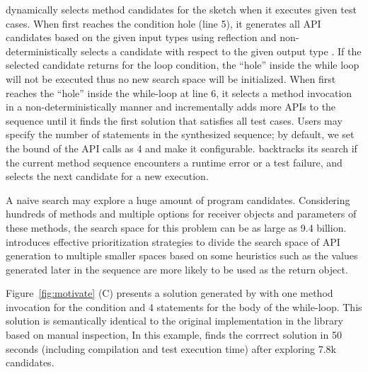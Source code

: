 \tool dynamically selects method candidates for the sketch when it executes given test cases.  When \tool first reaches the  condition hole (line 5), it generates all API candidates based on the given input types using reflection and non-deterministically selects a candidate  with respect to the given output type . If the selected candidate returns  for the  loop condition, the ``hole'' inside the while loop will not be executed thus no new search space will be initialized. When \tool first reaches the ``hole'' inside the while-loop at line 6, it  selects a method invocation in a non-deterministically manner and incrementally adds more APIs to the sequence until it finds the first solution that satisfies all test cases. Users may specify the number of statements in the synthesized sequence; by default, we set the bound of the API calls as 4 and make it configurable.  \tool backtracks its search if the current method sequence encounters a runtime error or a test failure, and selects the next candidate for a new execution.  

A naive search may explore a huge amount of program candidates. Considering hundreds of methods and multiple options for receiver objects and parameters of these methods, the search space for this problem can be as large as 9.4 billion.  \tool introduces effective prioritization strategies to divide the search space of API generation to multiple smaller spaces based on some heuristics such as the values generated later in the sequence are more likely to be used as the return object. 


Figure~\ref{fig:motivate} (C) presents a solution generated by \tool with one method invocation for the  condition and 4 statements for the  body of the while-loop. This  solution is semantically identical to the original implementation in the library based on manual inspection, In this example, \tool finds the corrrect solution in 50 seconds (including compilation and test execution time) after exploring 7.8k candidates. 


  



